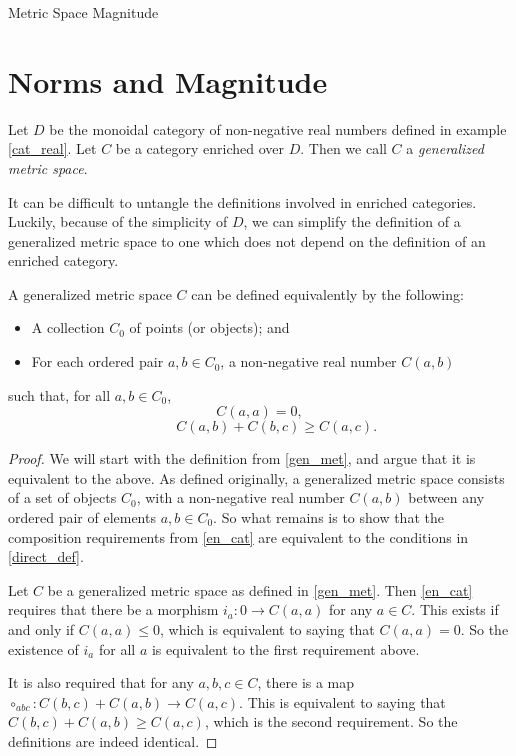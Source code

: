 \documentclass[12pt]{pom_thesis}
\begin{document}
\begin{chapter}{Metric Space Magnitude}
\section{Norms and Magnitude}

\begin{defn}\label{gen_met}
Let $D$ be the monoidal category of non-negative real numbers defined in example \ref{cat_real}. Let $C$ be a category enriched over $D$. Then we call $C$ a \emph{generalized metric space}.
\end{defn}
It can be difficult to untangle the definitions involved in enriched categories. Luckily, because of the simplicity of $D$, we can simplify the definition of a generalized metric space to one which does not depend on the definition of an enriched category.
\begin{thm}\label{direct_def}
A generalized metric space $C$ can be defined equivalently by the following:
\begin{itemize}
\item A collection $C_0$ of points (or objects); and
\item For each ordered pair $a,b \in C_0$, a non-negative real number $C(a,b)$
\end{itemize}
such that, for all $a,b \in C_0$,
\[C(a,a) = 0,
\]
\[\hspace{1cm} C(a,b) + C(b,c) \geq C(a,c).
\]
\end{thm}
\begin{proof}
We will start with the definition from \ref{gen_met}, and argue that it is equivalent to the above. As defined originally, a generalized metric space consists of a set of objects $C_0$, with a non-negative real number $C(a,b)$ between any ordered pair of elements $a,b \in C_0$. So what remains is to show that the composition requirements from \ref{en_cat} are equivalent to the conditions in \ref{direct_def}. 

Let $C$ be a generalized metric space as defined in \ref{gen_met}. Then \ref{en_cat} requires that there be a morphism $i_a:0 \rightarrow C(a,a)$ for any $a \in C$. This exists if and only if $C(a,a) \leq 0$, which is equivalent to saying that $C(a,a)=0$. So the existence of $i_a$ for all $a$ is equivalent to the first requirement above.

It is also required that for any $a,b,c \in C$, there is a map $\circ_{abc}: C(b,c) + C(a,b) \rightarrow C(a,c)$. This is equivalent to saying that $C(b,c) + C(a,b) \geq C(a,c)$, which is the second requirement. So the definitions are indeed identical.
\end{proof}



\end{chapter}
\end{document}
